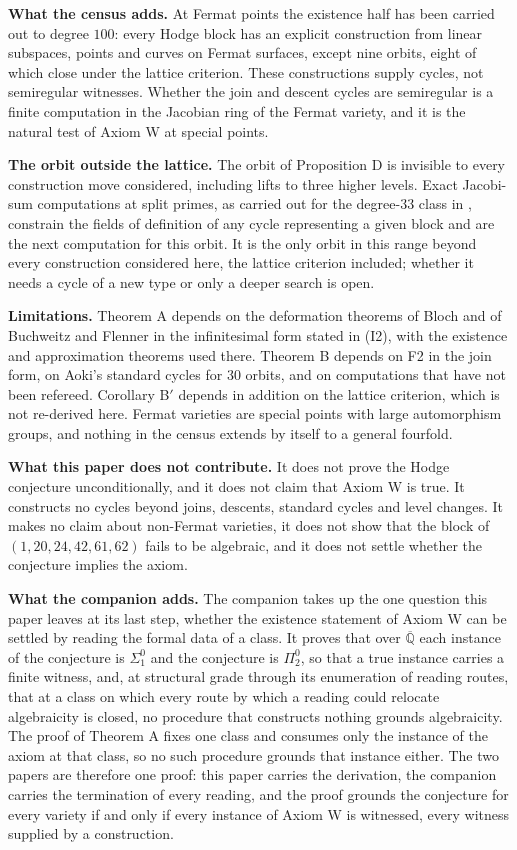 \documentclass[10pt,twocolumn]{article}
\begin{document}
\textbf{What the census adds.} At Fermat points the existence half has
been carried out to degree \(100\): every Hodge block has an explicit
construction from linear subspaces, points and curves on Fermat
surfaces, except nine orbits, eight of which close under the lattice
criterion. These constructions supply cycles, not semiregular witnesses.
Whether the join and descent cycles are semiregular is a finite
computation in the Jacobian ring of the Fermat variety, and it is the
natural test of Axiom W at special points.

\textbf{The orbit outside the lattice.} The orbit of Proposition D is
invisible to every construction move considered, including lifts to
three higher levels. Exact Jacobi-sum computations at split primes, as
carried out for the degree-\(33\) class in \cite{jumagulov2026},
constrain the fields of definition of any cycle representing a given
block and are the next computation for this orbit. It is the only orbit
in this range beyond every construction considered here, the lattice
criterion included; whether it needs a cycle of a new type or only a
deeper search is open.

\textbf{Limitations.} Theorem A depends on the deformation theorems of
Bloch and of Buchweitz and Flenner in the infinitesimal form stated in
(I2), with the existence and approximation theorems used there. Theorem
B depends on F2 in the join form, on Aoki's standard cycles for \(30\)
orbits, and on computations that have not been refereed. Corollary
B\('\) depends in addition on the lattice criterion, which is not
re-derived here. Fermat varieties are special points with large
automorphism groups, and nothing in the census extends by itself to a
general fourfold.

\textbf{What this paper does not contribute.} It does not prove the
Hodge conjecture unconditionally, and it does not claim that Axiom W is
true. It constructs no cycles beyond joins, descents, standard cycles
and level changes. It makes no claim about non-Fermat varieties, it does
not show that the block of \((1,20,24,42,61,62)\) fails to be algebraic,
and it does not settle whether the conjecture implies the axiom.

\textbf{What the companion adds.} The companion \cite{islam2026term}
takes up the one question this paper leaves at its last step, whether
the existence statement of Axiom W can be settled by reading the formal
data of a class. It proves that over \(\overline{\mathbb{Q}}\) each
instance of the conjecture is \(\Sigma^0_1\) and the conjecture is
\(\Pi^0_2\), so that a true instance carries a finite witness, and, at
structural grade through its enumeration of reading routes, that at a
class on which every route by which a reading could relocate
algebraicity is closed, no procedure that constructs nothing grounds
algebraicity. The proof of Theorem A fixes one class and consumes only
the instance of the axiom at that class, so no such procedure grounds
that instance either. The two papers are therefore one proof: this paper
carries the derivation, the companion carries the termination of every
reading, and the proof grounds the conjecture for every variety if and
only if every instance of Axiom W is witnessed, every witness supplied
by a construction.
\end{document}
